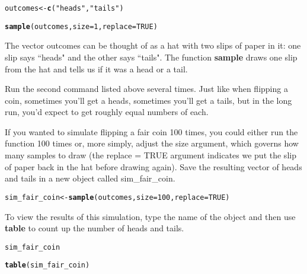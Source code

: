 \documentclass{article}\usepackage[]{graphicx}\usepackage[]{color}
\makeatletter
\newcommand{\hlnum}[1]{\textcolor[rgb]{0.686,0.059,0.569}{#1}}%
\newcommand{\hlstr}[1]{\textcolor[rgb]{0.192,0.494,0.8}{#1}}%
\newcommand{\hlstd}[1]{\textcolor[rgb]{0.345,0.345,0.345}{#1}}%
\newcommand{\hlkwb}[1]{\textcolor[rgb]{0.69,0.353,0.396}{#1}}%
\newcommand{\hlkwc}[1]{\textcolor[rgb]{0.333,0.667,0.333}{#1}}%
\newcommand{\hlkwd}[1]{\textcolor[rgb]{0.737,0.353,0.396}{\textbf{#1}}}%
\newenvironment{kframe}{%
 \def\at@end@of@kframe{}%
 \ifinner\ifhmode%
  \def\at@end@of@kframe{\end{minipage}}%
  \begin{minipage}{\columnwidth}%
 \fi\fi%
 \def\FrameCommand##1{\hskip\@totalleftmargin \hskip-\fboxsep
 \colorbox{shadecolor}{##1}\hskip-\fboxsep
     \hskip-\linewidth \hskip-\@totalleftmargin \hskip\columnwidth}%
 \MakeFramed {\advance\hsize-\width
   \@totalleftmargin\z@ \linewidth\hsize
   \@setminipage}}%
 {\par\unskip\endMakeFramed%
 \at@end@of@kframe}
\newenvironment{knitrout}{}{} %
\makeatother
\begin{document}
\begin{knitrout}
\color{fgcolor}\begin{kframe}
\begin{alltt}
\hlstd{outcomes} \hlkwb{<-} \hlkwd{c}\hlstd{(}\hlstr{"heads"}\hlstd{,} \hlstr{"tails"}\hlstd{)}

\hlkwd{sample}\hlstd{(outcomes,} \hlkwc{size} \hlstd{=} \hlnum{1}\hlstd{,} \hlkwc{replace} \hlstd{=} \hlnum{TRUE}\hlstd{)}
\end{alltt}
\end{kframe}
\end{knitrout}


The vector \hlstd{outcomes} can be thought of as a hat with two slips of paper in it: one slip says ``heads" and the other says ``tails". The function \hlkwd{sample} draws one slip from the hat and tells us if it was a head or a tail. 

Run the second command listed above several times. Just like when flipping a coin, sometimes you'll get a heads, sometimes you'll get a tails, but in the long run, you'd expect to get roughly equal numbers of each.

If you wanted to simulate flipping a fair coin 100 times, you could either run the function 100 times or, more simply, adjust the \hlkwc{size} argument, which governs how many samples to draw (the \hlkwc{replace = }\hlnum{TRUE} argument indicates we put the slip of paper back in the hat before drawing again). Save the resulting vector of heads and tails in a new object called \hlstd{sim\_fair\_coin}.

\begin{knitrout}
\color{fgcolor}\begin{kframe}
\begin{alltt}
\hlstd{sim_fair_coin} \hlkwb{<-} \hlkwd{sample}\hlstd{(outcomes,} \hlkwc{size} \hlstd{=} \hlnum{100}\hlstd{,} \hlkwc{replace} \hlstd{=} \hlnum{TRUE}\hlstd{)}
\end{alltt}
\end{kframe}
\end{knitrout}


To view the results of this simulation, type the name of the object and then use \hlkwd{table} to count up the number of heads and tails.

\begin{knitrout}
\color{fgcolor}\begin{kframe}
\begin{alltt}
\hlstd{sim_fair_coin}

\hlkwd{table}\hlstd{(sim_fair_coin)}
\end{alltt}
\end{kframe}
\end{knitrout}
\end{document}
